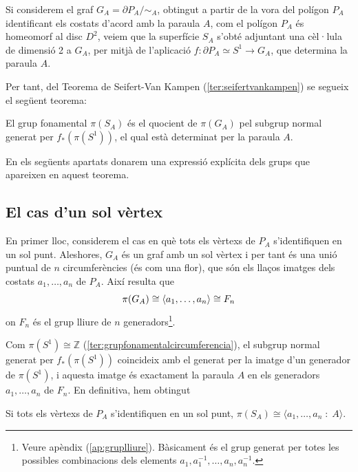\documentclass[../main.tex]{subfiles}
\begin{document}
Si considerem el graf $G_A = \partial P_A / \sim_A$, obtingut a partir de la vora del polígon $P_A$ identificant els costats d'acord amb la paraula $A$, com el polígon $P_A$ és homeomorf al disc $D^2$, veiem que la superfície $S_A$ s'obté adjuntant una cèl·lula de dimensió 2 a $G_A$, per mitjà de l'aplicació $f:\partial P_A\simeq S^1\rightarrow G_A$, que determina la paraula $A$.

Per tant, del Teorema de Seifert-Van Kampen (\ref{ter:seifertvankampen}) se segueix el següent teorema:

\begin{ter}
\label{ter:grupfonamentalsuperficie} El grup fonamental $\pi(S_A)$ és el quocient de $\pi(G_A)$ pel subgrup normal generat per $f_*(\pi(S^1))$, el qual està determinat per la paraula $A$.
\end{ter}

En els següents apartats donarem una expressió explícita dels grups que apareixen en aquest teorema.

\subsection{El cas d'un sol vèrtex}

En primer lloc, considerem el cas en què tots els vèrtexs de $P_A$ s'identifiquen en un sol punt. Aleshores, $G_A$ és un graf amb un sol vèrtex i per tant és una unió puntual de $n$ circumferències (és com una flor), que són els llaços imatges dels costats $a_1,\ldots,a_n$ de $P_A$. Així resulta que 
\begin{equation}
    \notag
    \pi(G_A)\cong\langle a_1,\ldots,a_n\rangle\cong F_n
\end{equation}
on $F_n$ és el grup lliure de $n$ generadors\footnote{Veure apèndix (\ref{ap:gruplliure}). Bàsicament és el grup generat per totes les possibles combinacions dels elements $a_1,a_1^{-1},\ldots,a_n,a_n^{-1}$.}.

Com $\pi(S^1)\cong \mathbb{Z}$ (\ref{ter:grupfonamentalcircumferencia}), el subgrup normal generat per $f_*(\pi(S^1))$ coincideix amb el generat per la imatge d'un generador de $\pi(S^1)$, i aquesta imatge és exactament la paraula $A$ en els generadors $a_1,\ldots,a_n$ de $F_n$. En definitiva, hem obtingut
\begin{ter}\label{ter:unsolvertex} Si tots els vèrtexs de $P_A$ s'identifiquen en un sol punt, $\pi(S_A)\cong\langle a_1,\ldots,a_n\;:\;A\rangle$.
\end{ter}
\end{document}

